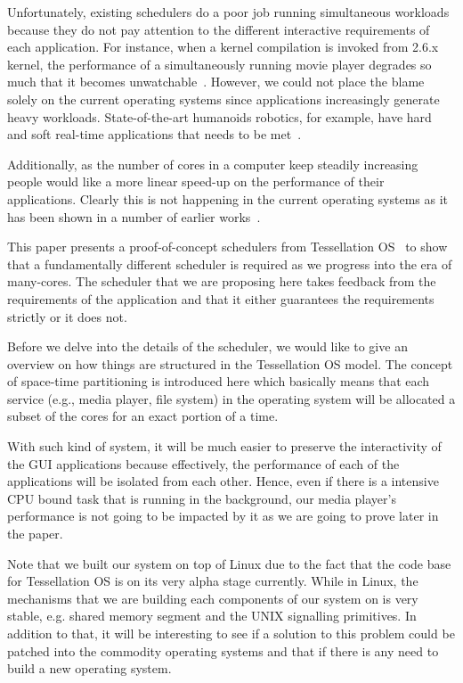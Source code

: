 \documentclass[letterpaper,twocolumn,11pt]{article}
\begin{document}
Unfortunately, existing schedulers do a poor job running simultaneous workloads because they do not pay attention to the different interactive requirements of each application. For instance, when a kernel compilation is invoked from 2.6.x kernel, the performance of a simultaneously running movie player degrades so much that it becomes unwatchable~\cite{DBLP:conf/osdi/YangLBKM08}. However, we could not place the blame solely on the current operating systems since applications increasingly generate heavy workloads. State-of-the-art humanoids robotics, for example, have hard and soft real-time applications that needs to be met~\cite{Yoo:2009:RPD:1618617.1618723, Kaneko04humanoidrobot}. 

Additionally, as the number of cores in a computer keep steadily increasing people would like a more linear speed-up on the performance of their applications. Clearly this is not happening in the current operating systems as it has been shown in a number of earlier works~\cite{linux:osdi10}.

This paper presents a proof-of-concept schedulers from Tessellation OS~\cite{liu09tessellation, tessellation-hotpar10} to show that a fundamentally different scheduler is required as we progress into the era of many-cores. The scheduler that we are proposing here takes feedback from the requirements of the application and that it either guarantees the requirements strictly or it does not.

Before we delve into the details of the scheduler, we would like to give an overview on how things are structured in the Tessellation OS model. The concept of space-time partitioning is introduced here which basically means that each service (e.g., media player, file system) in the operating system will be allocated a subset of the cores for an exact portion of a time. 

With such kind of system, it will be much easier to preserve the interactivity of the GUI applications because effectively, the performance of each of the applications will be isolated from each other. Hence, even if there is a intensive CPU bound task that is running in the background, our media player's performance is not going to be impacted by it as we are going to prove later in the paper.

Note that we built our system on top of Linux due to the fact that the code base for Tessellation OS is on its very alpha stage currently. While in Linux, the mechanisms that we are building each components of our system on is very stable, e.g. shared memory segment and the UNIX signalling primitives. In addition to that, it will be interesting to see if a solution to this problem could be patched into the commodity operating systems and that if there is any need to build a new operating system.
\end{document}
